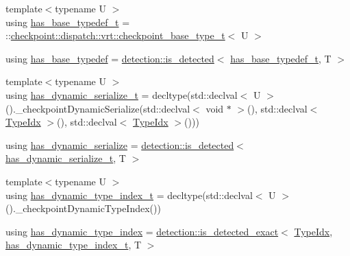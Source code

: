 \begin{DoxyCompactItemize}
\item 
{\footnotesize template$<$typename U $>$ }\\using \hyperlink{structcheckpoint_1_1dispatch_1_1vrt_1_1_virtual_serialize_traits_a900e9fcb655c36ab48fd6db0f0258b75}{has\+\_\+base\+\_\+typedef\+\_\+t} = \+::\hyperlink{namespacecheckpoint_1_1dispatch_1_1vrt_a41abdf16741a7c58e926d9813985bd2f}{checkpoint\+::dispatch\+::vrt\+::checkpoint\+\_\+base\+\_\+type\+\_\+t}$<$ U $>$
\item 
using \hyperlink{structcheckpoint_1_1dispatch_1_1vrt_1_1_virtual_serialize_traits_a5ef65f047ffa20ed206485238ceb2af5}{has\+\_\+base\+\_\+typedef} = \hyperlink{namespacedetection_a30893549a3de1e9603d78dad6d5dce92}{detection\+::is\+\_\+detected}$<$ \hyperlink{structcheckpoint_1_1dispatch_1_1vrt_1_1_virtual_serialize_traits_a900e9fcb655c36ab48fd6db0f0258b75}{has\+\_\+base\+\_\+typedef\+\_\+t}, T $>$
\item 
{\footnotesize template$<$typename U $>$ }\\using \hyperlink{structcheckpoint_1_1dispatch_1_1vrt_1_1_virtual_serialize_traits_a5b78afee2cf468bf3fedddb017c9aad0}{has\+\_\+dynamic\+\_\+serialize\+\_\+t} = decltype(std\+::declval$<$ U $>$().\+\_\+checkpoint\+Dynamic\+Serialize(std\+::declval$<$ void $\ast$ $>$(), std\+::declval$<$ \hyperlink{namespacecheckpoint_1_1dispatch_1_1vrt_acd3f9e6b091bcfbc23dc35ea8ef45d3b}{Type\+Idx} $>$(), std\+::declval$<$ \hyperlink{namespacecheckpoint_1_1dispatch_1_1vrt_acd3f9e6b091bcfbc23dc35ea8ef45d3b}{Type\+Idx} $>$()))
\item 
using \hyperlink{structcheckpoint_1_1dispatch_1_1vrt_1_1_virtual_serialize_traits_a716daac95820b854a4f7dc6ae1eb8d2f}{has\+\_\+dynamic\+\_\+serialize} = \hyperlink{namespacedetection_a30893549a3de1e9603d78dad6d5dce92}{detection\+::is\+\_\+detected}$<$ \hyperlink{structcheckpoint_1_1dispatch_1_1vrt_1_1_virtual_serialize_traits_a5b78afee2cf468bf3fedddb017c9aad0}{has\+\_\+dynamic\+\_\+serialize\+\_\+t}, T $>$
\item 
{\footnotesize template$<$typename U $>$ }\\using \hyperlink{structcheckpoint_1_1dispatch_1_1vrt_1_1_virtual_serialize_traits_a6a4e72c1d80374001f122c17ac1cc0e8}{has\+\_\+dynamic\+\_\+type\+\_\+index\+\_\+t} = decltype(std\+::declval$<$ U $>$().\+\_\+checkpoint\+Dynamic\+Type\+Index())
\item 
using \hyperlink{structcheckpoint_1_1dispatch_1_1vrt_1_1_virtual_serialize_traits_a5eb693a371780ee8f5e81a825e62bd5d}{has\+\_\+dynamic\+\_\+type\+\_\+index} = \hyperlink{namespacedetection_affc661f546e50448d9582e54280f7a11}{detection\+::is\+\_\+detected\+\_\+exact}$<$ \hyperlink{namespacecheckpoint_1_1dispatch_1_1vrt_acd3f9e6b091bcfbc23dc35ea8ef45d3b}{Type\+Idx}, \hyperlink{structcheckpoint_1_1dispatch_1_1vrt_1_1_virtual_serialize_traits_a6a4e72c1d80374001f122c17ac1cc0e8}{has\+\_\+dynamic\+\_\+type\+\_\+index\+\_\+t}, T $>$
\end{DoxyCompactItemize}
